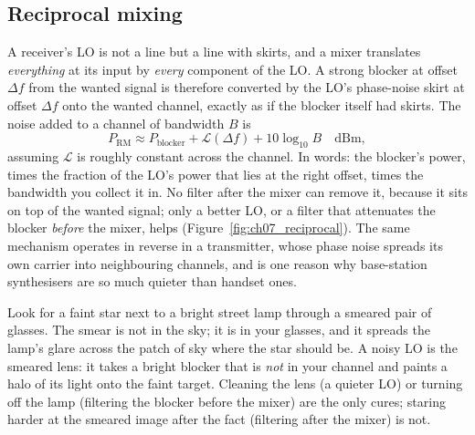 \subsection{Reciprocal mixing}
\label{sec:ch07:recip}

A receiver's LO is not a line but a line with skirts, and a mixer translates \emph{everything} at its
input by \emph{every} component of the LO. A strong blocker at offset $\Delta f$ from the wanted signal
is therefore converted by the LO's phase-noise skirt at offset $\Delta f$ onto the wanted channel,
exactly as if the blocker itself had skirts. The noise added to a channel of bandwidth $B$ is
\begin{equation}
P_{\text{RM}}\approx P_{\text{blocker}}+\mathcal{L}(\Delta f)+10\log_{10}B\quad\text{dBm},
\label{eq:ch07:recip}
\end{equation}
assuming $\mathcal L$ is roughly constant across the channel. In words: the blocker's power, times the
fraction of the LO's power that lies at the right offset, times the bandwidth you collect it in. No
filter after the mixer can remove it, because it sits on top of the wanted signal; only a better LO, or
a filter that attenuates the blocker \emph{before} the mixer, helps (Figure~\ref{fig:ch07_reciprocal}).
The same mechanism operates in reverse in a transmitter, whose phase noise spreads its own carrier into
neighbouring channels, and is one reason why base-station synthesisers are so much quieter than handset
ones.

\begin{analogy}
Look for a faint star next to a bright street lamp through a smeared pair of glasses. The smear is
not in the sky; it is in your glasses, and it spreads the lamp's glare across the patch of sky where
the star should be. A noisy LO is the smeared lens: it takes a bright blocker that is \emph{not} in your
channel and paints a halo of its light onto the faint target. Cleaning the lens (a quieter LO) or
turning off the lamp (filtering the blocker before the mixer) are the only cures; staring harder at the
smeared image after the fact (filtering after the mixer) is not.
\end{analogy}


